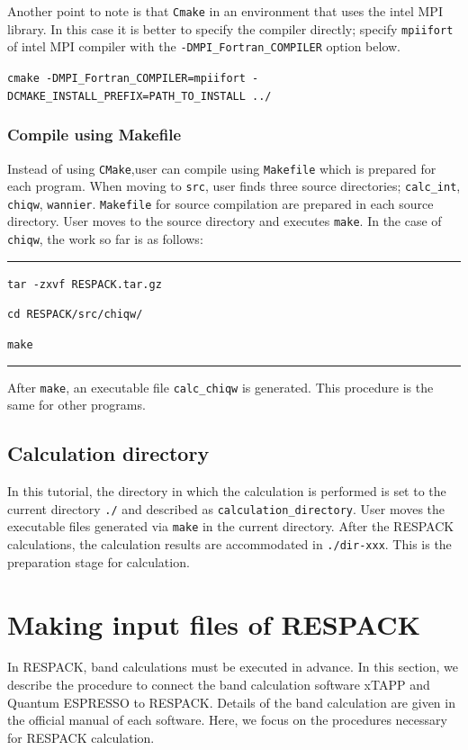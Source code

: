 \documentclass{article}
\begin{document}
Another point to note is that {\tt Cmake} in an environment that uses the {\sc intel MPI} library. In this case it is better to specify the compiler directly; specify {\tt mpiifort} of {\sc intel MPI} compiler with the {\tt -DMPI\_Fortran\_COMPILER} option below. 

\texttt{cmake -DMPI\_Fortran\_COMPILER=mpiifort -DCMAKE\_INSTALL\_PREFIX=PATH\_TO\_INSTALL ../} 

\subsubsection{Compile using Makefile}
Instead of using {\tt CMake},user can compile using {\tt Makefile} which is prepared for each program. When moving to {\tt src}, user finds three source directories; {\tt calc\_int}, {\tt chiqw}, {\tt wannier}.  {\tt Makefile} for source compilation are prepared in each source directory. User moves to the source directory and executes {\tt make}. In the case of \verb+chiqw+, the work so far is as follows: 
\vspace{3mm}\hrule\vspace{3mm}
{\tt tar -zxvf RESPACK.tar.gz}

{\tt cd RESPACK/src/chiqw/}

{\tt make} 
\vspace{3mm}\hrule\vspace{3mm}
After \verb+make+, an executable file \verb+calc_chiqw+ is generated. This procedure is the same for other programs.

\subsection{Calculation directory}
In this tutorial, the directory in which the calculation is performed is set to the current directory {\tt ./} and described as {\tt calculation\_directory}. User moves the executable files generated via {\tt make} in the current directory. After the RESPACK calculations, the calculation results are accommodated in {\tt ./dir-xxx}. This is the preparation stage for calculation.

\clearpage 

\section{\label{gendirwfn}Making input files of RESPACK} 

In RESPACK, band calculations must be executed in advance. In this section, we describe the procedure to connect the band calculation software {\sc xTAPP} and {\sc Quantum ESPRESSO} to RESPACK. Details of the band calculation are given in the official manual of each software. Here, we focus on the procedures necessary for {\sc RESPACK} calculation.
\end{document}
